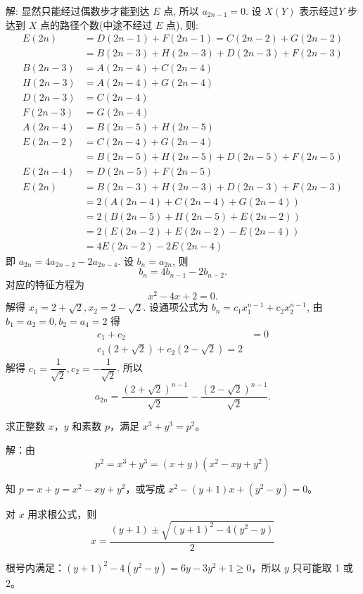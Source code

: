 解: 显然只能经过偶数步才能到达 $E$ 点, 所以 $a_{2n-1} = 0$. 设 $X(Y)$ 表示经过$Y$ 步达到 $X$ 点的路径个数(中途不经过 $E$ 点), 则:
\begin{align*}
E(2n) &= D(2n-1) + F(2n-1) = C(2n-2) + G(2n-2) \\
&= B(2n-3) + H(2n-3) + D(2n-3) + F(2n-3) \\
B(2n-3) &= A(2n-4) + C(2n-4) \\
H(2n-3) &= A(2n-4) + G(2n-4) \\
D(2n-3) &= C(2n-4) \\
F(2n-3) &=  G(2n-4) \\
A(2n-4) &= B(2n-5)+H(2n-5)\\
E(2n-2) &= C(2n-4) + G(2n-4)\\
&= B(2n-5) + H(2n-5) + D(2n-5) + F(2n-5)\\
E(2n-4) &= D(2n-5) + F(2n-5)\\
E(2n) &= B(2n-3) + H(2n-3) + D(2n-3) + F(2n-3) \\
&= 2(A(2n-4) + C(2n-4) + G(2n-4)) \\
&= 2(B(2n-5)+H(2n-5) + E(2n-2))\\
&= 2(E(2n-2) + E(2n-2) - E(2n-4))\\
&= 4E(2n-2) - 2E(2n-4)
\end{align*}
即 $a_{2n} = 4a_{2n-2}-2a_{2n-4}$.  设 $b_n = a_{2n}$, 则 
$$b_n = 4b_{n-1} - 2b_{n-2}. $$
对应的特征方程为
$$x^2 - 4x + 2 = 0 .$$
解得 $x_1 = 2+\sqrt{2}, x_2 = 2-\sqrt{2}$. 设通项公式为 $b_n = c_1x_1^{n-1} + c_2x_2^{n-1}$, 由
$b_1 = a_2 = 0, b_2 = a_4 = 2$ 得
\begin{align*}
c_1 + c_2 &= 0 \\
c_1(2+\sqrt{2}) + c_2(2-\sqrt{2}) = 2
\end{align*}
解得 $c_1 = \dfrac{1}{\sqrt{2}}, c_2 = -\dfrac{1}{\sqrt{2}}$. 所以
\[a_{2n} = \frac{(2+\sqrt{2})^{n-1}}{\sqrt{2}} - \frac{(2-\sqrt{2})^{n-1}}{\sqrt{2}} .\]

\newpage
求正整数 $ x $，$ y $ 和素数 $ p $，满足 $ x^3+y^3=p^2 $。

解：由 
\begin{equation*}
p^2=x^3+y^3=(x+y)(x^2-xy+y^2 )
\end{equation*}

知 $ p=x+y=x^2-xy+y^2 $，或写成 $ x^2-(y+1)x+(y^2-y)=0 $。

对 $ x $ 用求根公式，则
\[ 
x=\frac{(y+1)\pm\sqrt{(y+1)^2-4(y^2-y)}}{2} 
\]

根号内满足：$ (y+1)^2-4(y^2-y)=6y-3y^2+1\ge 0 $，所以 $ y $ 只可能取 1 或 2。

